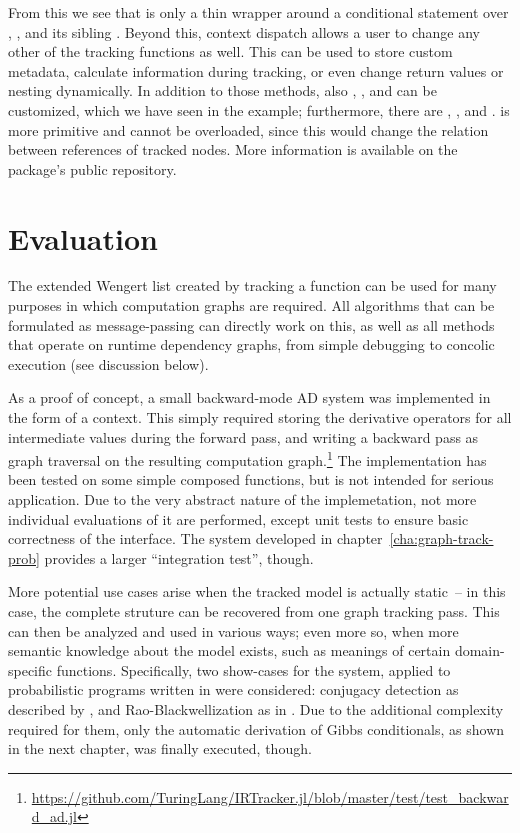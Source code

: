 From this we see that  is only a thin wrapper around a conditional statement over
, , and its sibling .  Beyond this,
context dispatch allows a user to change any other of the tracking functions as well.  This can be
used to store custom metadata, calculate information during tracking, or even change return values
or nesting dynamically.  In addition to those methods, also ,
, and  can be customized, which we have seen in the example;
furthermore, there are , , and .
 is more primitive and cannot be overloaded, since this would change the
relation between references of tracked nodes.  More information is available on the package's public
repository.

\section{Evaluation}
\label{sec:irtracker-eval}

The extended Wengert list created by tracking a function can be used for many purposes in which
computation graphs are required.  All algorithms that can be formulated as message-passing can
directly work on this, as well as all methods that operate on runtime dependency graphs, from simple
debugging to concolic execution (see discussion below).

As a proof of concept, a small backward-mode AD system was implemented in the form of a context.
This simply required storing the derivative operators for all intermediate values during the forward
pass, and writing a backward pass as graph traversal on the resulting computation
graph.\footnote{\href{https://github.com/TuringLang/IRTracker.jl/blob/760143734de1bf4e90da655d833e7999fc0ab2de/test/test_backward_ad.jl}{\url{https://github.com/TuringLang/IRTracker.jl/blob/master/test/test_backward_ad.jl}}}
The implementation has been tested on some simple composed functions, but is not intended for
serious application.  Due to the very abstract nature of the implemetation, not more individual
evaluations of it are performed, except unit tests to ensure basic correctness of the interface.
The system developed in chapter~\ref{cha:graph-track-prob} provides a larger \enquote{integration
  test}, though.

More potential use cases arise when the tracked model is actually static~-- in this case, the
complete struture can be recovered from one graph tracking pass.  This can then be analyzed and used
in various ways; even more so, when more semantic knowledge about the model exists, such as meanings
of certain domain-specific functions.  Specifically, two show-cases for the system, applied to
probabilistic programs written in \turingjl{} were considered: conjugacy detection as described by
\textcite{hoffman2018autoconj}, and Rao-Blackwellization as in \textcite{murray2017delayed}.  Due to
the additional complexity required for them, only the automatic derivation of Gibbs conditionals, as
shown in the next chapter, was finally executed, though.

